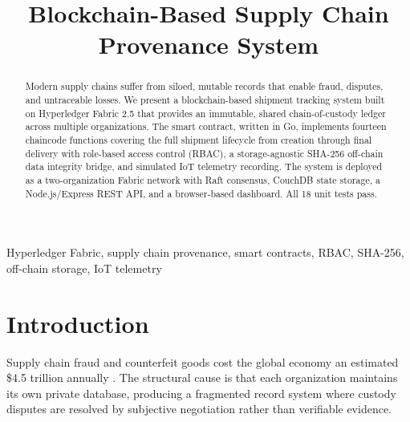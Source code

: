 \documentclass[conference]{IEEEtran}
\begin{document}
\title{Blockchain-Based Supply Chain Provenance System}

\author{
\and
{}
\and
{}
\and
{}
\and
{}
}

\maketitle

\begin{abstract}
Modern supply chains suffer from siloed, mutable records that enable fraud,
disputes, and untraceable losses.  We present a blockchain-based shipment
tracking system built on Hyperledger Fabric 2.5 that provides an immutable,
shared chain-of-custody ledger across multiple organizations.  The smart
contract, written in Go, implements fourteen chaincode functions covering the
full shipment lifecycle  from creation through final delivery  with
role-based access control (RBAC), a storage-agnostic SHA-256 off-chain data
integrity bridge, and simulated IoT telemetry recording.  The system is
deployed as a two-organization Fabric network with Raft consensus, CouchDB
state storage, a Node.js/Express REST API, and a browser-based dashboard.
All 18 unit tests pass.
\end{abstract}

\begin{IEEEkeywords}
Hyperledger Fabric, supply chain provenance, smart contracts, RBAC,
SHA-256, off-chain storage, IoT telemetry
\end{IEEEkeywords}

\section{Introduction}

Supply chain fraud and counterfeit goods cost the global economy an
estimated \$4.5 trillion annually \cite{shakhbulatov2020}.  The structural
cause is that each organization maintains its own private database, producing
a fragmented record system where custody disputes are resolved by subjective
negotiation rather than verifiable evidence.
\end{document}

